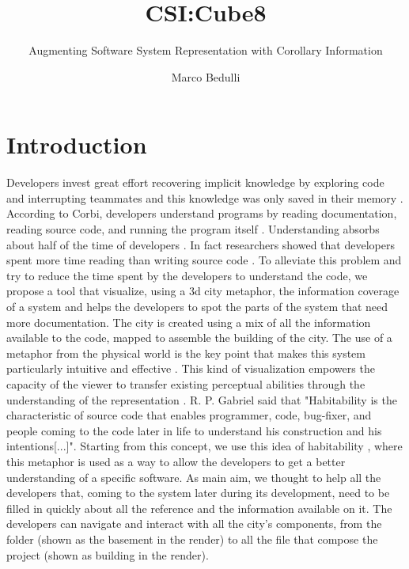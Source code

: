 \documentclass[]{usiinfbachelorproject}
\author{Marco Bedulli}
\title{CSI:Cube8}
\subtitle{Augmenting Software System Representation with Corollary Information}
\begin{document}
\maketitle

\tableofcontents 


\pagebreak
\listoffigures

\pagebreak

\section{Introduction} \label{introduction}



Developers invest great effort recovering implicit knowledge by exploring code and interrupting teammates and this knowledge was only saved in their memory \cite{LaToza}.
According to Corbi, developers understand programs by reading documentation, reading source code, and running the program itself
\cite{Corbi}. Understanding absorbs about half of the time of developers \cite{Corbi,Guimaraes}. In fact researchers showed that developers spent more time reading than writing source code \cite{Mayrhauser}.
To alleviate this problem and try to reduce the time spent by the developers to understand the code, we propose a tool that visualize, using a 3d city metaphor, the information coverage of a system and helps the developers to spot the parts of the system that need more documentation. 
The city is created using a mix of all the information available to the code, mapped to assemble the building of the city. The use of a metaphor from the physical world is the key point that makes this system particularly intuitive and effective \cite{SoftwareWorld}. This kind of visualization empowers the capacity of the viewer to transfer existing perceptual abilities through the understanding of the representation \cite{programComp}.
R. P. Gabriel \cite{gabry} said that "Habitability is the characteristic of source code that enables programmer, code, bug-fixer, and people coming to the code later in life to understand his construction and his intentions[...]". 
Starting from this concept, we use this idea of habitability \cite{vssac}, where this metaphor is used as a way to allow the developers to get a better understanding of a specific software. 
As main aim, we thought to help all the developers that, coming to the system later during its development, need to be filled in quickly about all the reference and the information available on it.
The developers can navigate and interact with all the city's components, from the folder (shown as the basement in the render) to all the file that compose the project (shown as building in the render). 
\end{document}
